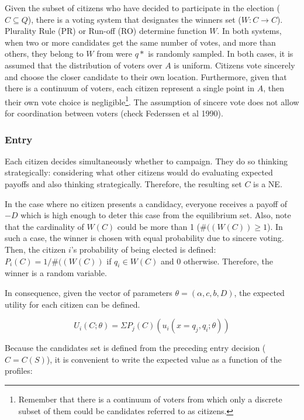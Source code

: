 Given the subset of citizens who have decided to participate in the
election (\(C \subseteq Q\)), there is a voting system that designates
the winners set (\(W: C \rightarrow C\)). Plurality Rule (PR) or Run-off
(RO) determine function \(W\). In both systems, when two or more
candidates get the same number of votes, and more than others, they
belong to \(W\) from were \(q*\) is randomly sampled. In both cases, it
is assumed that the distribution of voters over \(A\) is uniform.
Citizens vote sincerely and choose the closer candidate to their own
location. Furthermore, given that there is a continuum of voters, each
citizen represent a single point in \(A\), then their own vote choice is
negligible\footnote{Remember that there is a continuum of voters from
	which only a discrete subset of them could be candidates referred to
	as citizens.}. The assumption of sincere vote does not allow for
coordination between voters (check Federssen et al 1990).

\subsubsection{Entry}\label{entry}

Each citizen decides simultaneously whether to campaign. They do so
thinking strategically: considering what other citizens would do
evaluating expected payoffs and also thinking strategically. Therefore,
the resulting set \(C\) is a NE. %

In the case where no citizen presents a candidacy, everyone receives a
payoff of \(-D\) which is high enough to deter this case from the
equilibrium set. Also, note that the cardinality of \(W(C)\) could be more than 1
(\(\#((W(C)) \ge 1\)). In such a case, the winner is chosen with equal
probability due to sincere voting. Then, the citizen \(i\)'s probability
of being elected is defined: \(P_i(C)=1/\#((W(C))\) if \(q_i \in W(C)\)
and \(0\) otherwise. Therefore, the winner is a random variable.

In consequence, given the vector of parameters
\(\theta= (\alpha, c, b, D)\), the expected utility for each citizen can
be defined.

\begin{equation}
U_i( C;\theta )=\Sigma P_j(C)(u_i(x=q_j,q_i;\theta))
\end{equation}

\label{eq:EU}

Because the candidates set is defined from the preceding entry decision
(\(C=C(S)\)), it is convenient to write the expected value as a function
of the profiles:

